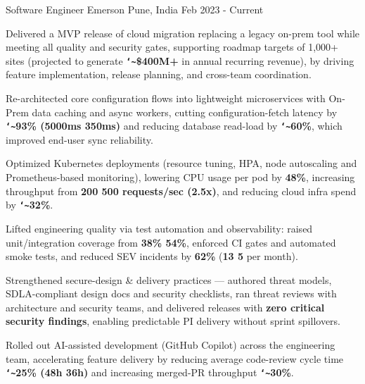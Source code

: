 

\begin{cventries}

  \cventry
    {Software Engineer} %
    {Emerson} %
    {Pune, India} %
    {Feb 2023 - Current} %
    {
      \begin{cvitems} %
        \item {Delivered a MVP release of cloud migration replacing a legacy on-prem tool while meeting all quality and security gates, supporting roadmap targets of 1,000+ sites (projected to generate \textbf{\texttt{\char`\~}\$400M+} in annual recurring revenue), by driving feature implementation, release planning, and cross-team coordination.}
        \item {Re-architected core configuration flows into lightweight microservices with On-Prem data caching and async workers, cutting configuration-fetch latency by \textbf{\texttt{\char`\~}93\% (5000ms \glyphstyle{\textrightarrow} 350ms)} and reducing database read-load by \textbf{\texttt{\char`\~}60\%}, which improved end-user sync reliability.}
        \item {Optimized Kubernetes deployments (resource tuning, HPA, node autoscaling and Prometheus-based monitoring), lowering CPU usage per pod by \textbf{48\%}, increasing throughput from \textbf{200 \glyphstyle{\textrightarrow} 500 requests/sec (2.5x)}, and reducing cloud infra spend by \textbf{\texttt{\char`\~}32\%}.}
        \item {Lifted engineering quality via test automation and observability: raised unit/integration coverage from \textbf{38\% \glyphstyle{\textrightarrow} 54\%}, enforced CI gates and automated smoke tests, and reduced SEV incidents by \textbf{62\%} (\textbf{13 \glyphstyle{\textrightarrow} 5} per month).}
        \item {Strengthened secure-design \& delivery practices — authored threat models, SDLA-compliant design docs and security checklists, ran threat reviews with architecture and security teams, and delivered releases with \textbf{zero critical security findings}, enabling predictable PI delivery without sprint spillovers.}
        \item {Rolled out AI-assisted development (GitHub Copilot) across the engineering team, accelerating feature delivery by reducing average code-review cycle time  \textbf{\texttt{\char`\~}25\% (48h \glyphstyle{\textrightarrow} 36h)} and increasing merged-PR throughput \textbf{\texttt{\char`\~}30\%}.}
      \end{cvitems}
    }


\end{cventries}
